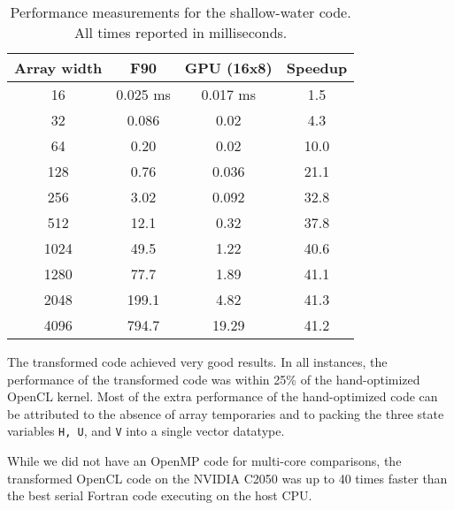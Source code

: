 \begin{table}
\begin{center}
	\begin{tabular}{|c|c|c|c|}
	\hline Array width & F90 & GPU (16x8) & Speedup \\ \hline\hline
	16   & 0.025 ms & 0.017 ms & 1.5  \\ \hline
	32   & 0.086    & 0.02     & 4.3  \\ \hline
	64   & 0.20     & 0.02     & 10.0 \\ \hline
	128  & 0.76     & 0.036    & 21.1 \\ \hline
	256  & 3.02     & 0.092    & 32.8 \\ \hline
	512  & 12.1     & 0.32     & 37.8 \\ \hline
	1024 & 49.5     & 1.22     & 40.6 \\ \hline
	1280 & 77.7     & 1.89     & 41.1 \\ \hline
	2048 & 199.1    &  4.82    & 41.3 \\ \hline
	4096 & 794.7    & 19.29    & 41.2 \\ \hline
	\end{tabular}
\end{center}
\caption{Performance measurements for the shallow-water code.  All times reported in milliseconds.}
\label{table:performance}
\end{table}

The transformed code achieved very good results.  In all instances, the
performance of the transformed code was within 25\% of the hand-optimized OpenCL
kernel.  Most of the extra performance of the hand-optimized code can be
attributed to the absence of array temporaries and to packing the three state
variables {\tt H, U}, and {\tt V} into a single vector datatype.

While we did not have an OpenMP code for multi-core comparisons, the transformed
OpenCL code on the NVIDIA C2050 was up to 40 times faster than the best serial
Fortran code executing on the host CPU.


